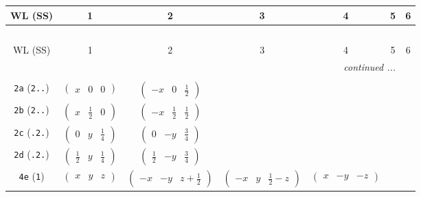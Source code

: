 \documentclass[fleqn,9pt,landscape]{jsarticle}
\begin{document}
\begin{center}
\renewcommand{\arraystretch}{1.2}
\begin{longtable}{ccccccc}
 \hline \hline
WL (SS) & 1 & 2 & 3 & 4 & 5 & 6 \\ \hline \endfirsthead

\multicolumn{6}{l}{\tablename\ \thetable{}} \\
 \hline \hline
WL (SS) & 1 & 2 & 3 & 4 & 5 & 6 \\ \hline \endhead

 \hline \hline
\multicolumn{6}{r}{\footnotesize\it continued ...} \\ \endfoot

 \hline \hline
\multicolumn{6}{r}{} \\ \endlastfoot

{\tt 2a} ({\tt 2..}) & $ \begin{pmatrix} x & 0 & 0 \end{pmatrix} $ & $ \begin{pmatrix} - x & 0 & \frac{1}{2} \end{pmatrix} $ & $  $ & $  $ \\ \hline
{\tt 2b} ({\tt 2..}) & $ \begin{pmatrix} x & \frac{1}{2} & 0 \end{pmatrix} $ & $ \begin{pmatrix} - x & \frac{1}{2} & \frac{1}{2} \end{pmatrix} $ & $  $ & $  $ \\ \hline
{\tt 2c} ({\tt .2.}) & $ \begin{pmatrix} 0 & y & \frac{1}{4} \end{pmatrix} $ & $ \begin{pmatrix} 0 & - y & \frac{3}{4} \end{pmatrix} $ & $  $ & $  $ \\ \hline
{\tt 2d} ({\tt .2.}) & $ \begin{pmatrix} \frac{1}{2} & y & \frac{1}{4} \end{pmatrix} $ & $ \begin{pmatrix} \frac{1}{2} & - y & \frac{3}{4} \end{pmatrix} $ & $  $ & $  $ \\ \hline
{\tt 4e} ({\tt 1}) & $ \begin{pmatrix} x & y & z \end{pmatrix} $ & $ \begin{pmatrix} - x & - y & z + \frac{1}{2} \end{pmatrix} $ & $ \begin{pmatrix} - x & y & \frac{1}{2} - z \end{pmatrix} $ & $ \begin{pmatrix} x & - y & - z \end{pmatrix} $ \\
\end{longtable}
\end{center}
\end{document}
